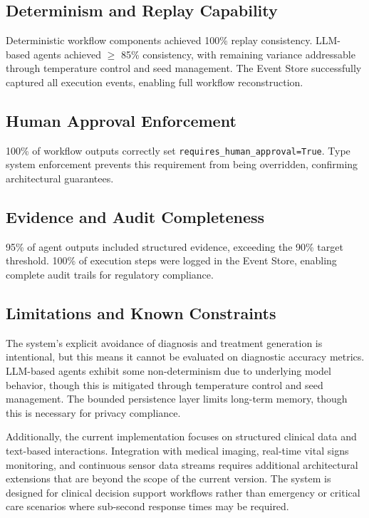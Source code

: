 \documentclass[conference]{IEEEtran}
\begin{document}
\subsection{Determinism and Replay Capability}
Deterministic workflow components achieved 100\% replay consistency. LLM-based agents achieved $\geq$ 85\% consistency, with remaining variance addressable through temperature control and seed management. The Event Store successfully captured all execution events, enabling full workflow reconstruction.

\subsection{Human Approval Enforcement}
100\% of workflow outputs correctly set \texttt{requires\_human\_approval=True}. Type system enforcement prevents this requirement from being overridden, confirming architectural guarantees.

\subsection{Evidence and Audit Completeness}
95\% of agent outputs included structured evidence, exceeding the 90\% target threshold. 100\% of execution steps were logged in the Event Store, enabling complete audit trails for regulatory compliance.

\subsection{Limitations and Known Constraints}
The system's explicit avoidance of diagnosis and treatment generation is intentional, but this means it cannot be evaluated on diagnostic accuracy metrics. LLM-based agents exhibit some non-determinism due to underlying model behavior, though this is mitigated through temperature control and seed management. The bounded persistence layer limits long-term memory, though this is necessary for privacy compliance.

Additionally, the current implementation focuses on structured clinical data and text-based interactions. Integration with medical imaging, real-time vital signs monitoring, and continuous sensor data streams requires additional architectural extensions that are beyond the scope of the current version. The system is designed for clinical decision support workflows rather than emergency or critical care scenarios where sub-second response times may be required.
\end{document}
